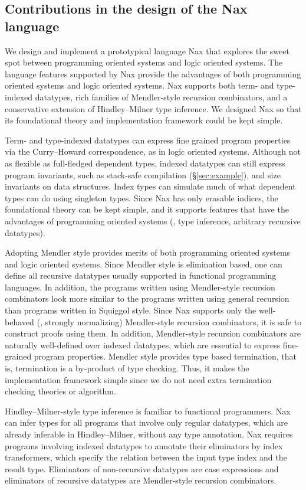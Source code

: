 \subsection{Contributions in the design of the Nax language}
We design and implement a prototypical language Nax that explores
the sweet spot between programming oriented systems and logic oriented systems.
The language features supported by Nax provide the advantages
of both programming oriented systems and logic oriented systems.
Nax supports both term- and type-indexed datatypes,
rich families of Mendler-style recursion combinators,
and a conservative extension of Hindley--Milner type inference.
We designed Nax so that its foundational theory and
implementation framework could be kept simple.

Term- and type-indexed datatypes can express fine grained program properties
via the Curry--Howard correspondence, as in logic oriented systems. Although
not as flexible as full-fledged dependent types, indexed datatypes can
still express program invariants, such as stack-safe compilation
(\S\ref{sec:example}), and size invariants on data structures.
Index types can simulate much of what
dependent types can do using singleton types. Since Nax has only erasable
indices, the foundational theory can be kept simple, and it supports
features that have the advantages of programming oriented systems 
(\eg, type inference, arbitrary recursive datatypes).

Adopting Mendler style provides merits of both programming oriented systems
and logic oriented systems. Since Mendler style is elimination based, one can
define all recursive datatypes usually supported in functional programming
languages. In addition, the programs written using Mendler-style recursion
combinators look more similar to the programs written using general recursion
than programs written in Squiggol style.
Since Nax supports only the well-behaved (\ie, strongly normalizing)
Mendler-style recursion combinators, it is safe to construct proofs using them.
In addition, Mendler-style recursion combinators are naturally well-defined
over indexed datatypes, which are essential to express fine-grained program
properties. Mendler style provides type based termination, that is, termination
is a by-product of type checking. Thus, it makes the implementation framework
simple since we do not need extra termination checking theories or algorithm.

Hindley--Milner-style type inference is familiar 
to functional programmers.
Nax can infer types for all programs that involve only regular datatypes,
which are already inferable in Hindley--Milner, without any type annotation.
Nax requires programs involving indexed datatypes to annotate their eliminators
by index transformers, which specify the relation between the input type index
and the result type. Eliminators of non-recursive datatypes are case expressions
and eliminators of recursive datatypes are Mendler-style recursion combinators.

